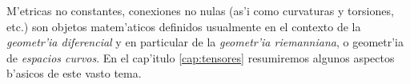 M'etricas no constantes, conexiones no nulas (as'i como curvaturas y torsiones, etc.) son objetos matem'aticos definidos usualmente en el contexto de la \textit{geometr'ia diferencial} y en particular de la \textit{geometr'ia riemanniana}, o geometr'ia de \textit{espacios curvos}. En el cap'itulo \ref{cap:tensores} resumiremos algunos aspectos b'asicos de este vasto tema.

%
%
%
